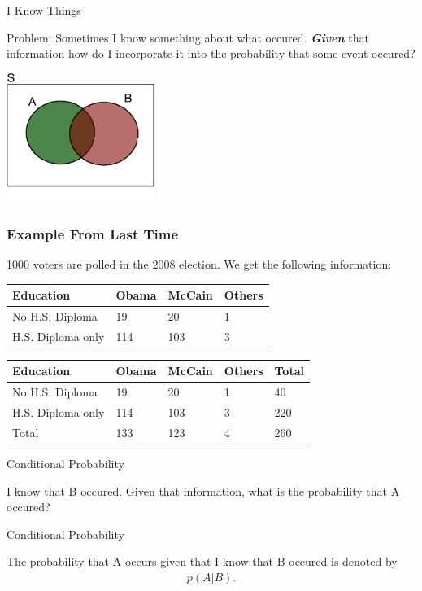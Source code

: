 \begin{frame}{I Know Things}

  Problem: Sometimes I know something about what
  occured. \textit{\textbf{Given}} that information how do I incorporate it
  into the probability that some event occured?

  \vfill
  \includegraphics[width=5cm]{img/vennDiagram}
  \vfill
  
\end{frame}

\begin{frame}
  \frametitle{Example From Last Time}

  1000 voters are polled in the 2008 election. We get the following
  information: \\
  {
    \begin{tabular}{l|l|l|l}
      Education & Obama & McCain & Others  \\ \hline
      No H.S. Diploma & 19 & 20 & 1   \\
      H.S. Diploma only & 114 & 103 & 3 
    \end{tabular}
  }
  {
    \begin{tabular}{l|l|l|l|l}
      Education & Obama & McCain & Others & Total \\ \hline
      No H.S. Diploma & 19 & 20 & 1 & 40 \\
      H.S. Diploma only & 114 & 103 & 3 & 220 \\ \hline
      Total & 133 & 123 & 4 & 260
    \end{tabular}
  }



\end{frame}



\begin{frame}{Conditional Probability}

  I know that B occured. Given that information, what is the
  probability that A occured?

  \begin{definition}{Conditional Probability}

    The probability that A occurs given that I know that B occured is
    denoted by
    \begin{eqnarray*}
      p(A|B).
    \end{eqnarray*}
    
  \end{definition}
  
\end{frame}





